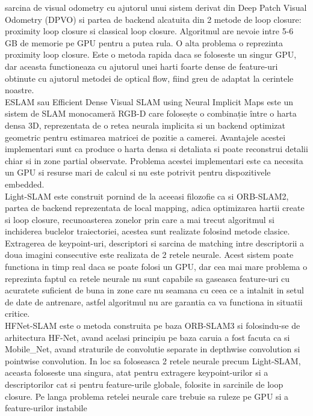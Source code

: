 \documentclass[12pt,a4paper]{report}
\begin{document}
sarcina de visual odometry cu ajutorul unui sistem derivat din Deep Patch Visual Odometry (DPVO)
si partea de backend alcatuita din 2 metode de loop closure: proximity loop closure si classical
loop closure. Algoritmul are nevoie intre 5{-}6 GB de memorie pe GPU pentru a putea rula. 
O alta problema o reprezinta proximity loop closure. Este o metoda rapida daca se foloseste un
singur GPU, dar aceasta functioneaza cu ajutorul unei harti foarte dense de feature-uri obtinute
cu ajutorul metodei de optical flow, fiind greu de adaptat la cerintele noastre. \\
ESLAM sau Efficient Dense Visual SLAM using Neural Implicit Maps este un sistem de SLAM 
monocameră RGB-D care folosește o combinație între o harta densa 3D, reprezentata de o retea 
neurala implicita si un backend optimizat geometric pentru estimarea matricei de pozitie a camerei.
Avantajele acestei implementari sunt ca produce o harta densa si detaliata si poate reconstrui 
detalii chiar si in zone partial observate. Problema acestei implementari este ca necesita un 
GPU si resurse mari de calcul si nu este potrivit pentru dispozitivele embedded. \\
Light-SLAM este construit pornind de la aceeasi filozofie ca si ORB-SLAM2, partea de backend
reprezentata de local mapping, adica optimizarea hartii create si loop closure, recunoasterea
zonelor prin care a mai trecut algoritmul si inchiderea buclelor traiectoriei, acestea sunt 
realizate folosind metode clasice. Extragerea de keypoint-uri, descriptori si sarcina de 
matching intre descriptorii a doua imagini consecutive este realizata de 2 retele neurale.
Acest sistem poate functiona in timp real daca se poate folosi un GPU, dar cea mai mare 
problema o reprezinta faptul ca retele neurale nu sunt capabile sa gaseasca feature-uri cu
acuratete suficient de buna in zone care nu seamana cu ceea ce a  intalnit in setul de date
 de antrenare, astfel algoritmul nu are garantia ca va functiona in situatii critice.\\
HFNet-SLAM este o metoda construita pe baza ORB-SLAM3 si folosindu-se de arhitectura HF-Net, 
avand acelasi principiu pe baza caruia a fost facuta ca si Mobile\_Net, avand straturile de convolutie
separate in depthwise convolution si pointwise convolution. In loc sa foloseasca 2 retele neurale 
precum Light-SLAM, aceasta foloseste una singura, atat pentru extragere keypoint-urilor si a
descriptorilor cat si pentru feature-urile globale, folosite in sarcinile de loop closure. 
Pe langa problema retelei neurale care trebuie sa ruleze pe GPU si  a feature-urilor instabile 
\end{document}
